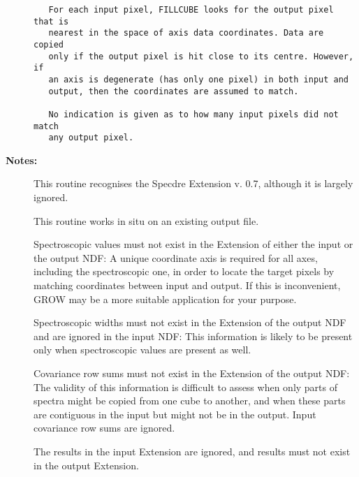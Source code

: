 \begin{description}
\begin{verbatim}
   For each input pixel, FILLCUBE looks for the output pixel that is
   nearest in the space of axis data coordinates. Data are copied
   only if the output pixel is hit close to its centre. However, if
   an axis is degenerate (has only one pixel) in both input and
   output, then the coordinates are assumed to match.

   No indication is given as to how many input pixels did not match
   any output pixel.
\end{verbatim}

\item [{\bf Notes:}]
This routine recognises the Specdre Extension v. 0.7, although
it is largely ignored.

This routine works in situ on an existing output file.

Spectroscopic values must not exist in the Extension of either
the input or the output NDF: A unique coordinate axis is
required for all axes, including the spectroscopic one, in
order to locate the target pixels by matching coordinates
between input and output. If this is inconvenient, GROW may be
a more suitable application for your purpose.

Spectroscopic widths must not exist in the Extension of the
output NDF and are ignored in the input NDF: This information
is likely to be present only when spectroscopic values are
present as well.

Covariance row sums must not exist in the Extension of the
output NDF: The validity of this information is difficult to
assess when only parts of spectra might be copied from one cube
to another, and when these parts are contiguous in the input
but might not be in the output. Input covariance row sums are
ignored.

The results in the input Extension are ignored, and results
must not exist in the output Extension.
\end{description}
